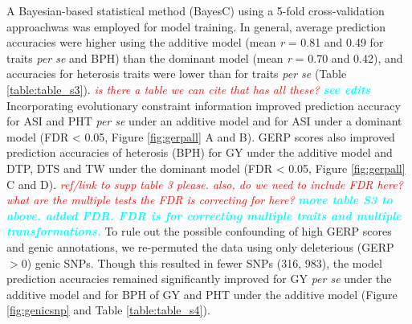 \documentclass[9pt,twocolumn,twoside]{gsajnl}
\newcommand{\yang}[1]{\textcolor{cyan}{\emph{\bf  #1}} }
\newcommand{\jri}[1]{\textcolor{red}{ \emph{ #1}} }
\begin{document}
A Bayesian-based statistical method (BayesC) \citep{habier2011extension} using a 5-fold cross-validation approachwas was employed for model training. 
In general, average prediction accuracies were higher using the additive model (mean \emph{r} = 0.81 and 0.49 for traits \emph{per se} and BPH) than the dominant model (mean \emph{r} = 0.70 and 0.42), and accuracies for heterosis traits were lower than for traits \emph{per se} (Table \ref{table:table_s3}). \jri{is there a table we can cite that has all these?} \yang{see edits}
Incorporating evolutionary constraint information improved prediction accuracy for ASI and PHT \emph{per se} under an additive model and for ASI under a dominant model (FDR < 0.05, Figure \ref{fig:gerpall} A and B).
GERP scores also improved prediction accuracies of heterosis (BPH) for GY under the additive model and DTP, DTS and TW under the dominant model (FDR < 0.05, Figure \ref{fig:gerpall} C and D). \jri{ref/link to supp table 3 please. also, do we need to include FDR here? what are the multiple tests the FDR is correcting for here?} \yang{move table S3 to above. added FDR. FDR is for correcting multiple traits and multiple transformations.}
To rule out the possible confounding of high GERP scores and genic annotations, we re-permuted the data using only deleterious (GERP $> 0$) genic SNPs.  
Though this resulted in fewer SNPs (316, 983), the model prediction accuracies remained significantly improved for GY \emph{per se} under the additive model and for BPH of GY and PHT under the additive model (Figure \ref{fig:genicsnp} and Table \ref{table:table_s4}).   

\end{document}
